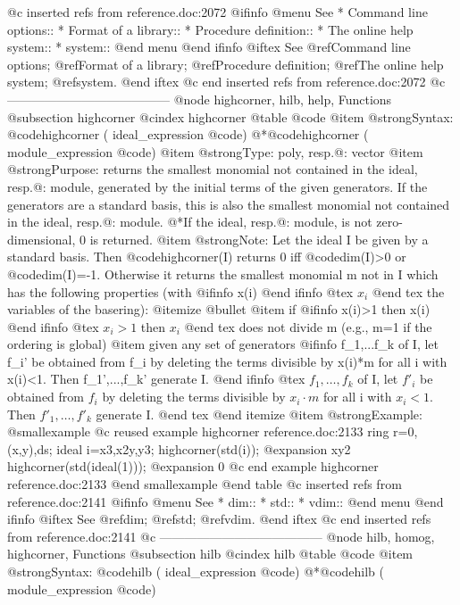 {@c inserted refs from reference.doc:2072
@ifinfo
@menu
See
* Command line options::
* Format of a library::
* Procedure definition::
* The online help system::
* system::
@end menu
@end ifinfo
@iftex
See
@ref{Command line options};
@ref{Format of a library};
@ref{Procedure definition};
@ref{The online help system};
@ref{system}.
@end iftex
@c end inserted refs from reference.doc:2072
@c ---------------------------------------
@node highcorner, hilb, help, Functions
@subsection highcorner
@cindex highcorner
@table @code
@item @strong{Syntax:}
@code{highcorner (} ideal_expression @code{)}
@*@code{highcorner (} module_expression @code{)}
@item @strong{Type:}
poly, resp.@: vector
@item @strong{Purpose:}
returns the smallest monomial not contained in
the ideal, resp.@: module, generated by the initial terms of the given
generators. If the generators are a standard basis,
this is also the smallest monomial not contained in the ideal, resp.@: module.
@*If the ideal, resp.@: module, is not zero-dimensional, 0 is returned.
@item @strong{Note:}
Let the ideal I be given by a standard basis. Then
@code{highcorner(I)} returns 0 iff @code{dim(I)>0} or @code{dim(I)=-1}.
Otherwise it returns the smallest monomial m not in I which has the following
properties (with
@ifinfo
x(i)
@end ifinfo
@tex
$x_i$
@end tex
the variables of the basering):
@itemize @bullet
@item
if
@ifinfo
x(i)>1 then x(i)
@end ifinfo
@tex
$x_i>1$ then $x_i$
@end tex
does not divide m (e.g., m=1 if the ordering is global)
@item
given any set of generators
@ifinfo
f_1,...f_k of I, let f_i' be obtained from
f_i by deleting the terms divisible by x(i)*m for all i with x(i)<1.
Then f_1',...,f_k' generate I.
@end ifinfo
@tex
$f_1,\dots,f_k$ of I, let $f'_i$ be obtained from
$f_i$ by deleting the terms divisible by $x_i\cdot m$ for all i with $x_i<1$.
Then $f'_1,\dots,f'_k$ generate I.
@end tex
@end itemize
@item @strong{Example:}
@smallexample
@c reused example highcorner reference.doc:2133 
ring r=0,(x,y),ds;
ideal i=x3,x2y,y3;
highcorner(std(i));
@expansion{} xy2
highcorner(std(ideal(1)));
@expansion{} 0
@c end example highcorner reference.doc:2133
@end smallexample
@end table
@c inserted refs from reference.doc:2141
@ifinfo
@menu
See
* dim::
* std::
* vdim::
@end menu
@end ifinfo
@iftex
See
@ref{dim};
@ref{std};
@ref{vdim}.
@end iftex
@c end inserted refs from reference.doc:2141
@c ---------------------------------------
@node hilb, homog, highcorner, Functions
@subsection hilb
@cindex hilb
@table @code
@item @strong{Syntax:}
@code{hilb (} ideal_expression @code{)}
@*@code{hilb (} module_expression @code{)}
}
